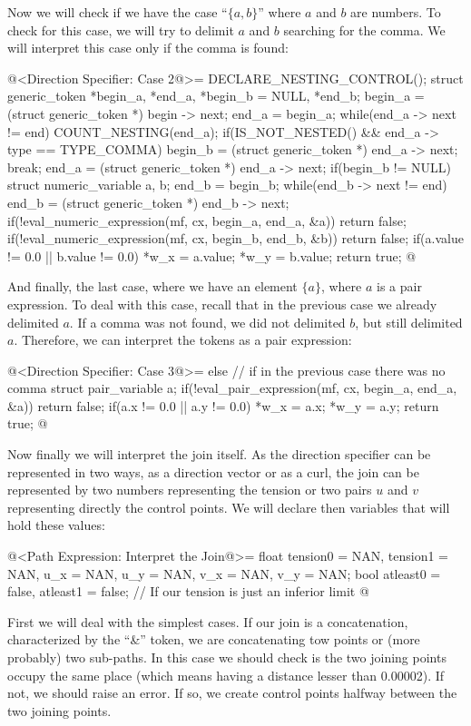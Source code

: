 Now we will check if we have the case ``$\{ a , b\}$'' where $a$ and
$b$ are numbers. To check for this case, we will try to delimit $a$
and $b$ searching for the comma. We will interpret this case only if
the comma is found:

\iniciocodigo
@<Direction Specifier: Case 2@>=
DECLARE_NESTING_CONTROL();
struct generic_token *begin_a, *end_a, *begin_b = NULL, *end_b;
begin_a = (struct generic_token *) begin -> next;
end_a = begin_a;
while(end_a -> next != end){
  COUNT_NESTING(end_a);
  if(IS_NOT_NESTED() && end_a -> type == TYPE_COMMA){
    begin_b = (struct generic_token *) end_a -> next;
    break;
  }
  end_a = (struct generic_token *) end_a -> next;
}
if(begin_b != NULL){
  struct numeric_variable a, b;
  end_b = begin_b;
  while(end_b -> next != end)
    end_b = (struct generic_token *) end_b -> next;
  if(!eval_numeric_expression(mf, cx, begin_a, end_a, &a))
    return false;
  if(!eval_numeric_expression(mf, cx, begin_b, end_b, &b))
    return false;
  if(a.value != 0.0 || b.value != 0.0){
    *w_x = a.value;
    *w_y = b.value;
  }
  return true;
}
@
\fimcodigo

And finally, the last case, where we have an element $\{a\}$, where
$a$ is a pair expression. To deal with this case, recall that in the
previous case we already delimited $a$. If a comma was not found, we
did not delimited $b$, but still delimited $a$. Therefore, we can
interpret the tokens as a pair expression:

\iniciocodigo
@<Direction Specifier: Case 3@>=
else{ // if in the previous case there was no comma
  struct pair_variable a;
  if(!eval_pair_expression(mf, cx, begin_a, end_a, &a))
    return false;
  if(a.x != 0.0 || a.y != 0.0){
    *w_x = a.x;
    *w_y = a.y;
  }
  return true;
}
@
\fimcodigo

Now finally we will interpret the join itself. As the direction
specifier can be represented in two ways, as a direction vector or as
a curl, the join can be represented by two numbers representing the
tension or two pairs $u$ and $v$ representing directly the control
points. We will declare then variables that will hold these values:

\iniciocodigo
@<Path Expression: Interpret the Join@>=
float tension0 = NAN, tension1 = NAN, u_x = NAN, u_y = NAN, v_x = NAN,
      v_y = NAN;
bool atleast0 = false, atleast1 = false; // If our tension is just an inferior limit
@
\fimcodigo

First we will deal with the simplest cases. If our join is a
concatenation, characterized by the ``\&'' token, we are concatenating
tow points or (more probably) two sub-paths. In this case we should
check is the two joining points occupy the same place (which means
having a distance lesser than 0.00002). If not, we should raise an
error. If so, we create control points halfway between the two joining
points.

